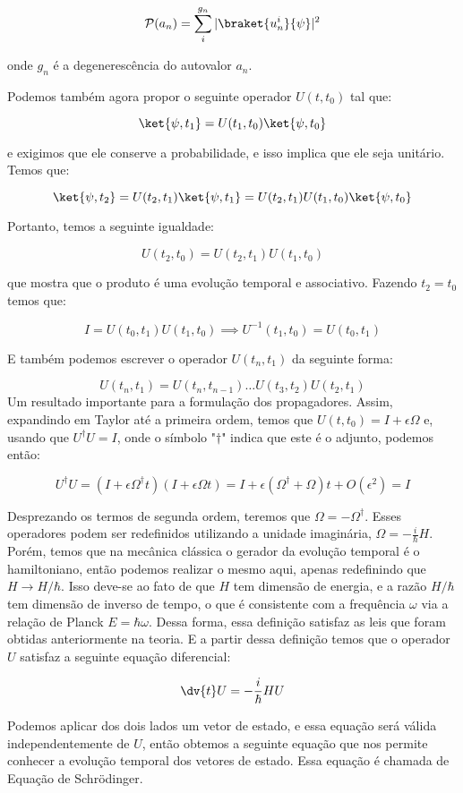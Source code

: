 \documentclass{article}
\begin{document}
	\[\mathcal{P}(a_n)=\sum^{g_n}_i|\braket{u^i_n}{\psi}|^2\]
	
	onde $g_n$ é a degenerescência do autovalor $a_n$.
	
	Podemos também agora propor o seguinte operador $U(t,t_0)$ tal que:
	
	\[\ket{\psi,t_1}=U(t_1,t_0)\ket{\psi,t_0}\]
	
	e exigimos que ele conserve a probabilidade, e isso implica que ele seja unitário. Temos que:
	
	\[\ket{\psi,t_2}=U(t_2,t_1)\ket{\psi,t_1}=U(t_2,t_1)U(t_1,t_0)\ket{\psi,t_0}\]
	
	Portanto, temos a seguinte igualdade:
	
	\[U(t_2,t_0)=U(t_2,t_1)U(t_1,t_0)\]
	
	que mostra que o produto é uma evolução temporal e associativo. Fazendo $t_2=t_0$ temos que:
	
	\[I=U(t_0,t_1)U(t_1,t_0) \implies U^{-1}(t_1,t_0)=U(t_0,t_1)\]
	
	E também podemos escrever o operador $U(t_n,t_1)$ da seguinte forma:
	
	\[U(t_n,t_1)=U(t_n,t_{n-1}) \dots U(t_3,t_2)U(t_2,t_1)\]
	\newpage
	Um resultado importante para a formulação dos propagadores. Assim, expandindo em Taylor até a primeira ordem, temos que $U(t,t_0)=I+\epsilon\Omega$ e, usando que $U^\dagger U=I$, onde o símbolo "$\dagger$" indica que este é o adjunto, podemos então:
	
	\[U^\dagger U=(I+\epsilon\Omega^\dagger t)(I+\epsilon\Omega t)=I+ \epsilon(\Omega^\dagger+\Omega)t+O(\epsilon^2)=I\]
	
	Desprezando os termos de segunda ordem, teremos que $\Omega=-\Omega^\dagger$. Esses operadores podem ser redefinidos utilizando a unidade imaginária, $\Omega=-\frac{i}{\hbar}H$. Porém, temos que na mecânica clássica o gerador da evolução temporal é o hamiltoniano, então podemos realizar o mesmo aqui, apenas redefinindo que $H \to H/\hbar$. Isso deve-se ao fato de que $H$ tem dimensão de energia, e a razão $H/\hbar$ tem dimensão de inverso de tempo, o que é consistente com a frequência $\omega$ via a relação de Planck $E=\hbar\omega$. Dessa forma, essa definição satisfaz as leis que foram obtidas anteriormente na teoria. E a partir dessa definição temos que o operador $U$ satisfaz a seguinte equação diferencial:
	
	\[\dv{t} U=-\frac{i}{\hbar}HU\]
	
	Podemos aplicar dos dois lados um vetor de estado, e essa equação será válida independentemente de $U$, então obtemos a seguinte equação que nos permite conhecer a evolução temporal dos vetores de estado. Essa equação é chamada de Equação de Schrödinger.
	
\end{document}
